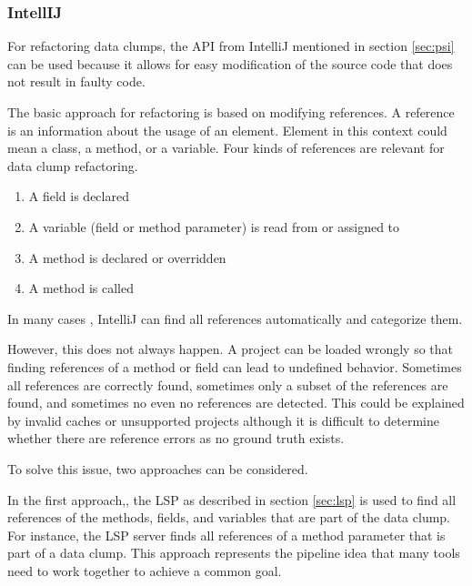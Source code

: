 \subsubsection{IntellIJ}

For refactoring data clumps, the  \ac{API} from IntelliJ mentioned in section \ref{sec:psi} can be used because it allows for easy modification of the source code that does not result in faulty code. 


\begin{comment}The reasons for this are difficult to determine and the documentation is scarce, so the the PSI approach seems to be only suitable for projects created via IntelliJ or correctly initialized by IntelliJ with the required meta data. Gradle and maven projects are therefore not suitable for the full refactoring step. 
\end{comment}


The basic approach for refactoring is based on modifying references. A  reference is an information about the usage of an element. Element in this context could mean a class, a method, or a variable. Four kinds of references are relevant for data clump refactoring.

\begin{enumerate}
     \item A field is declared
    \item A variable (field or method parameter) is read from or assigned to
   
    \item A method is declared or overridden
    \item A method is called
\end{enumerate}
In many cases , IntelliJ can find all references automatically and categorize them.

However, this does not always happen. A project can be loaded wrongly so that  finding references of a method or field can lead to undefined behavior. Sometimes all references are correctly found, sometimes only a subset of the references are found, and sometimes no even no references are detected. This could be explained by invalid caches or unsupported projects although it is difficult to determine whether there are reference errors as no ground truth exists.

To solve this issue, two approaches can be considered.

In the first approach,, the \ac{LSP} as described in section \ref{sec:lsp} is used to find all references of the methods, fields, and variables that are part of the data clump. For instance, the \ac{LSP} server finds all references of a method parameter that is part of a data clump. This approach represents the pipeline idea that many tools need to work together to achieve a common goal.


